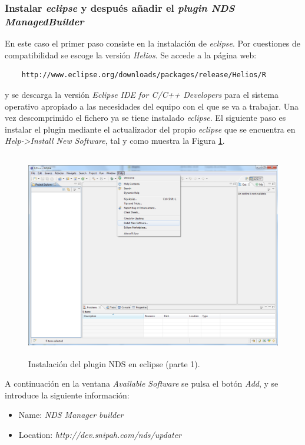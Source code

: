 \subsubsection{Instalar \textit{eclipse} y después añadir el \textit{plugin NDS ManagedBuilder}}
En este caso el primer paso consiste en la instalación de \textit{eclipse}. Por cuestiones de compatibilidad se escoge la versión \textit{Helios}. Se accede a la página web:
\begin{verbatim}
	http://www.eclipse.org/downloads/packages/release/Helios/R
	\end{verbatim}
y se descarga la versión  \textit{Eclipse IDE for C/C++ Developers} para el sistema operativo apropiado a las necesidades del equipo con el que se va a trabajar. Una vez descomprimido el fichero ya se tiene instalado \textit{eclipse}. El siguiente paso es 
instalar el plugin mediante el actualizador del propio \textit{eclipse} que se encuentra en \textit{Help->Install New Software}, tal y como muestra la Figura \ref{fig_c2_win1}.

\begin{figure}[t]
\centering
\includegraphics[height=9cm]{./Figuras/C2/c2_instalar_windows1.png}
\caption{Instalación del plugin NDS en eclipse (parte 1).}
\label{fig_c2_win1}
\end{figure}

A continuación en la ventana \textit{Available Software} se pulsa el botón \textit{Add}, y se introduce la siguiente información:
\begin{itemize}
	\item Name: \textit{NDS Manager builder}
	\item Location: \textit{http://dev.snipah.com/nds/updater}
\end{itemize}

